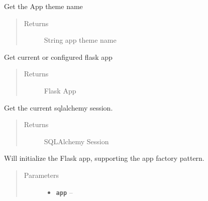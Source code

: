 \documentclass[letterpaper,10pt,english]{sphinxmanual}
\begin{document}
\begin{fulllineitems}

\begin{fulllineitems}
\label{api:flask.ext.appbuilder.base.AppBuilder.app_theme}
Get the App theme name
\begin{quote}\begin{description}
\item[{Returns}] \leavevmode
String app theme name

\end{description}\end{quote}

\end{fulllineitems}


\begin{fulllineitems}
\label{api:flask.ext.appbuilder.base.AppBuilder.get_app}
Get current or configured flask app
\begin{quote}\begin{description}
\item[{Returns}] \leavevmode
Flask App

\end{description}\end{quote}

\end{fulllineitems}


\begin{fulllineitems}
\label{api:flask.ext.appbuilder.base.AppBuilder.get_session}
Get the current sqlalchemy session.
\begin{quote}\begin{description}
\item[{Returns}] \leavevmode
SQLAlchemy Session

\end{description}\end{quote}

\end{fulllineitems}


\begin{fulllineitems}
\label{api:flask.ext.appbuilder.base.AppBuilder.init_app}
Will initialize the Flask app, supporting the app factory pattern.
\begin{quote}\begin{description}
\item[{Parameters}] \leavevmode\begin{itemize}
\item {} 
\textbf{\texttt{app}} -- 


\end{itemize}
\end{description}
\end{quote}
\end{fulllineitems}
\end{fulllineitems}
\end{document}
